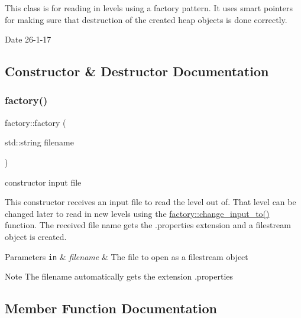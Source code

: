 This class is for reading in levels using a factory pattern. It uses smart pointers for making sure that destruction of the created heap objects is done correctly. \begin{DoxyDate}{Date}
26-\/1-\/17 
\end{DoxyDate}


\subsection{Constructor \& Destructor Documentation}
\mbox{\label{classfactory_af422815046ef8b9e95a4d8cb747fc43f}} 
\subsubsection{\texorpdfstring{factory()}{factory()}}
{\footnotesize\ttfamily factory\+::factory (\begin{DoxyParamCaption}\item[{std\+::string}]{filename }\end{DoxyParamCaption})}



constructor input file 

This constructor receives an input file to read the level out of. That level can be changed later to read in new levels using the \hyperlink{classfactory_a9e164a8fbb65188de99c39d55d7cc384}{factory\+::change\+\_\+input\+\_\+to()} function. The received file name gets the .properties extension and a filestream object is created. 
\begin{DoxyParams}[1]{Parameters}
\mbox{\tt in}  & {\em filename} & The file to open as a filestream object \\
\hline
\end{DoxyParams}
\begin{DoxyNote}{Note}
The filename automatically gets the extension .properties 
\end{DoxyNote}


\subsection{Member Function Documentation}
\mbox{\label{classfactory_a9e164a8fbb65188de99c39d55d7cc384}} 
